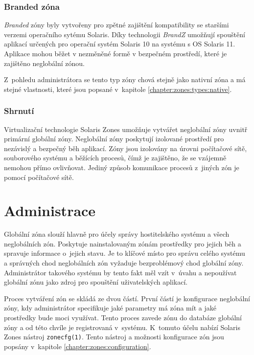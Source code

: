 \subsubsection{Branded zóna}
\label{chapter:zones:types:branded}
\textit{Branded} zóny byly vytvořeny pro zpětné zajištění kompatibility se staršími verzemi operačního sytému Solaris. Díky technologii
\textit{BrandZ} \cite{oracle:solaris:zones:brands} umožňují spouštění aplikací určených pro operační systém Solaris 10 na 
systému s OS Solaris 11. Aplikace mohou běžet v nezměněné formě v bezpečném prostředí, které je zajištěno neglobální zónou.

Z~pohledu administrátora se tento typ zóny chová stejně jako nativní zóna a má stejné vlastnosti, které jsou popsané
v~kapitole \ref{chapter:zones:types:native}.
\subsubsection{Shrnutí}
\label{chapter:zones:summary}
Virtualizační technologie Solaris Zones umožňuje vytvářet neglobální zóny uvnitř primární globální zóny. Neglobální zóny
poskytují izolované prostředí pro nezávislý a bezpečný běh aplikací. Zóny jsou izolovány na úrovni počítačové sítě,
souborového systému a běžících procesů, čímž je zajištěno, že se vzájemně nemohou přímo ovlivňovat. Jediný způsob komunikace
procesů z~jiných zón je pomocí počítačové sítě.
\section{Administrace}
\label{chapter:zones:administration}
Globální zóna slouží hlavně pro účely správy hostitelského systému a všech neglobálních zón. Poskytuje nainstalovaným zónám
prostředky pro jejich běh a spravuje informace o~jejich stavu. Je to klíčové místo pro správu celého systému a správných chod
neglobálních zón vyžaduje bezproblémový chod globální zóny. Administrátor takového systému by tento fakt měl vzít v~úvahu a
nepoužívat globální zónu jako zdroj pro spouštění uživatelských aplikací.

Proces vytváření zón se skládá ze dvou částí. První částí je konfigurace neglobální zóny, kdy administrátor specifikuje jaké
parametry má zóna mít a jaké prostředky bude moci využívat. Tento proces zavede zónu do databáze globální zóny a od této
chvíle je registrovaná v~systému. K~tomuto účelu nabízí Solaris Zones nástroj \verb|zonecfg(1)|. Tento nástroj a
možnosti konfigurace zón jsou popsány v~kapitole \ref{chapter:zones:configuration}.

